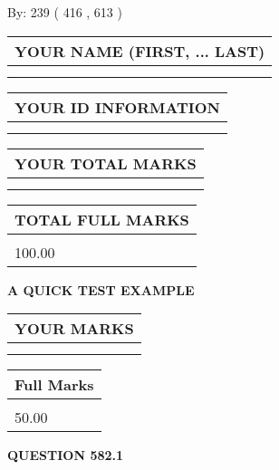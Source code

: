 \documentclass[12pt]{article}
\begin{document}
   
\hspace{1.0in} By: 
 239 ( 416 ,  613 )
   
   
   
   
\newpage 
\setcounter{page}{ 
   582001 } 
   
   
   
   
\noindent\begin{tabular}{|l|}
\hline
YOUR NAME (FIRST, ... LAST)  \\
\hline
 \\ 
 \\ 
\hline
\end{tabular}
\hspace{0.05in} \begin{tabular}{|l|}
\hline
 YOUR   ID   INFORMATION  \\
\hline
 \\ 
 \\ 
\hline
\end{tabular}
   
   
\vspace{0.2in}\noindent\begin{tabular}{|l|}
\hline
YOUR TOTAL MARKS  \\
\hline
 \\ 
 \\ 
\hline
\end{tabular}
\hspace{0.05in} \begin{tabular}{|l|}
\hline
TOTAL FULL MARKS  \\
\hline
 \\ 
100.00 \\
\hline
\end{tabular}
   
   
 \vspace{0.2in}
{\LARGE {\textbf{ A QUICK TEST EXAMPLE}}}
   
   
  
\vspace{0.2in}
  
\noindent\begin{tabular}{|l|}
\hline
 YOUR MARKS  \\
\hline
 \\ 
 \\ 
\hline
\end{tabular}
\hspace{0.05in} \begin{tabular}{|l|}
\hline
 Full Marks  \\
\hline
 \\ 
50.00 \\
\hline
\end{tabular}
{\textbf{\Large{QUESTION
582.1 
}}}
  
\end{document}
